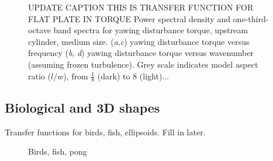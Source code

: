 \begin{figure} 
\caption{UPDATE CAPTION THIS IS TRANSFER FUNCTION FOR FLAT PLATE IN TORQUE Power spectral density and one-third-octave band spectra for yawing disturbance torque, upstream cylinder, medium size. (\textit{a},\textit{c}) yawing disturbance torque versus frequency (\textit{b}, \textit{d}) yawing disturbance torque versus wavenumber (assuming frozen turbulence).  Grey scale indicates model aspect ratio ($l/w$), from $\frac{1}{8}$ (dark) to \num{8} (light)...}
\end{figure}



\subsection{Biological and 3D shapes}
Transfer functions for birds, fish, ellipsoids.  Fill in later. 

\begin{figure} 
\caption{Birds, fish, pong}
\end{figure}


%







